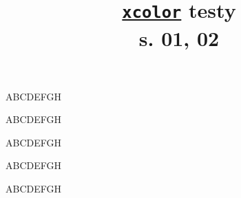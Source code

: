 \documentclass[a4paper,11pt]{article}
\title{\href{https://repo.skni.umcs.pl/ctan/macros/latex/contrib/xcolor/xcolor.pdf}{\texttt{xcolor}} testy \\
  s. 01, 02}
\author{}
\begin{document}





\maketitle %





ABCDEFGH



\newpage



\pagecolor{red}

ABCDEFGH



\newpage



ABCDEFGH



\newpage



\pagecolor[rgb]{0,1,0}

ABCDEFGH



\newpage



\nopagecolor

ABCDEFGH











\end{document}
